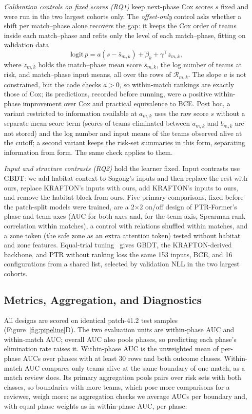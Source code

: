 \documentclass[sigconf,anonymous,nonacm]{acmart}
\begin{document}
\emph{Calibration controls on fixed scores (RQ1)} keep next-phase Cox scores $s$ fixed and were run in the two largest cohorts only. The \emph{offset-only} control asks whether a shift per match--phase alone recovers the gap: it keeps the Cox order of teams inside each match--phase and refits only the level of each match--phase, fitting on validation data
\begin{equation}
\mathrm{logit}\,p=a(s-\bar s_{m,k})+\beta_k+\gamma^{\top}z_{m,k},
\label{eq:offset}
\end{equation}
where $z_{m,k}$ holds the match--phase mean score $\bar s_{m,k}$, the log number of teams at risk, and match--phase input means, all over the rows of $\mathcal{R}_{m,k}$. The slope $a$ is not constrained, but the code checks $a>0$, so within-match rankings are exactly those of Cox; its predictions, recorded before running, were a positive within-phase improvement over Cox and practical equivalence to BCE. Post hoc, a variant restricted to information available at $a_{m,k}$ uses the raw score $s$ without a separate mean-score term (scores of teams eliminated between $a_{m,k}$ and $b_{m,k}$ are not stored) and the log number and input means of the teams observed alive at the cutoff; a second variant keeps the risk-set summaries in this form, separating information from form. The same check applies to them.

\emph{Input and structure contrasts (RQ2)} hold the learner fixed. Input contrasts use GBDT: we add habitat context to Sagong's inputs and then replace the rest with ours, replace KRAFTON's inputs with ours, add KRAFTON's inputs to ours, and remove the habitat block from ours. Five primary comparisons, fixed before the patch-split models were trained, are a 2$\times$2 on/off design of PTR-Former's phase and team axes (AUC for both axes and, for the team axis, Spearman rank correlation within matches), a control with relations shuffled within matches, and a zone token (the safe zone as an extra attention token) tested without habitat and zone features. Equal-trial tuning~\cite{Bergstra12,Cawley10} gives GBDT, the KRAFTON-derived backbone, and PTR without ranking loss the same 153 inputs, BCE, and 16 configurations from a shared list, selected by validation NLL in the two largest cohorts.

\subsection{Metrics, Aggregation, and Diagnostics}
\label{sec:method:units}
All designs are scored on identical patch-41.2 test samples (Figure~\ref{fig:pipeline}D). The two evaluation units are within-phase AUC and within-match AUC; overall AUC also pools phases, so predicting each phase's elimination rate raises it. Within-phase AUC is the unweighted mean of per-phase AUCs over phases with at least 30 rows and both outcome classes. Within-match AUC compares only teams alive at the same boundary of one match, as a match review does. Its primary aggregation pools pairs over risk sets with both classes, so boundaries with more teams, which pose more comparisons for a reviewer, weigh more; as aggregation checks we average AUCs per boundary and, with equal phase weights as in within-phase AUC, per phase.
\end{document}
